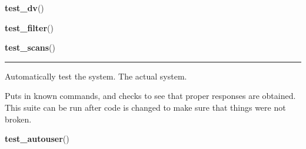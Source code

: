     \begin{boxedminipage}{\textwidth}

    \raggedright \textbf{test\_dv}()

    \end{boxedminipage}

    \label{tests:test_filter}

    \vspace{0.5ex}

    \begin{boxedminipage}{\textwidth}

    \raggedright \textbf{test\_filter}()

    \end{boxedminipage}

    \label{tests:test_scans}

    \vspace{0.5ex}

    \begin{boxedminipage}{\textwidth}

    \raggedright \textbf{test\_scans}()

    \vspace{-1.5ex}

    \rule{\textwidth}{0.5\fboxrule}
    Automatically test the system. The actual system.

    Puts in known commands, and checks to see that proper responses are 
    obtained. This suite can be run after code is changed to make sure that
    things were not broken.

    \vspace{1ex}

    \end{boxedminipage}

    \label{tests:test_autouser}

    \vspace{0.5ex}

    \begin{boxedminipage}{\textwidth}

    \raggedright \textbf{test\_autouser}()

    \end{boxedminipage}

    \label{tests:test_pydsp}

